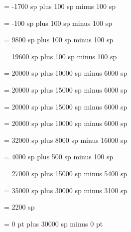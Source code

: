 \newskip\punctuminclinatumanddebilisshift
\punctuminclinatumanddebilisshift= -1700 sp plus 100 sp minus 100 sp%

\newskip\punctuminclinatumdebilisshift
\punctuminclinatumdebilisshift= -100 sp plus 100 sp minus 100 sp%

\newskip\punctuminclinatumbigshift %
\punctuminclinatumbigshift= 9800 sp plus 100 sp minus 100 sp%

\newskip\punctuminclinatummaxshift %
\punctuminclinatummaxshift= 19600 sp plus 100 sp minus 100 sp%

\newskip\spacearoundsmallbar
\spacearoundsmallbar = 20000 sp plus 10000 sp minus 6000 sp%

\newskip\spacearoundminor
\spacearoundminor = 20000 sp plus 15000 sp minus 6000 sp%

\newskip\spacearoundmaior
\spacearoundmaior = 20000 sp plus 15000 sp minus 6000 sp%

\newskip\spacearoundfinalis
\spacearoundfinalis = 20000 sp plus 10000 sp minus 6000 sp%

\newskip\spacebeforefinalfinalis
\spacebeforefinalfinalis= 32000 sp plus 8000 sp minus 16000 sp%

\newskip\spacearoundclefbars
\spacearoundclefbars= 4000 sp plus 500 sp minus 100 sp%

\newskip\textbartextspace
\textbartextspace = 27000 sp plus 15000 sp minus 5400 sp%

\newskip\notebarspace
\notebarspace = 35000 sp plus 30000 sp minus 3100 sp%

\newdimen\maximumspacewithoutdash
\maximumspacewithoutdash = 2200 sp%

\newskip\afterclefnospace
\afterclefnospace = 0 pt plus 30000 sp minus 0 pt%

